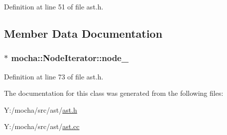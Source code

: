 Definition at line 51 of file ast.h.



\subsection{Member Data Documentation}
\hypertarget{classmocha_1_1_node_iterator_af421e60da561c014ce3002285f03d2b4}{
\subsubsection[{node\_\-}]{$\ast$ {\bf mocha::NodeIterator::node\_\-}}}
\label{classmocha_1_1_node_iterator_af421e60da561c014ce3002285f03d2b4}


Definition at line 73 of file ast.h.



The documentation for this class was generated from the following files:\begin{DoxyCompactItemize}
\item 
Y:/mocha/src/ast/\hyperlink{ast_8h}{ast.h}\item 
Y:/mocha/src/ast/\hyperlink{ast_8cc}{ast.cc}\end{DoxyCompactItemize}
